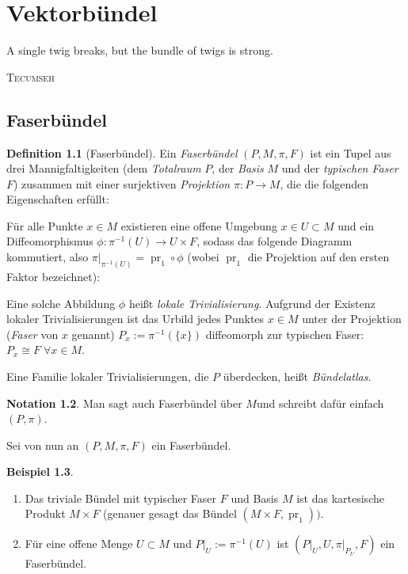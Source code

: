 \documentclass[a4paper]{scrbook}
\numberwithin{equation}{chapter}
\DeclareMathOperator{\pr}{pr}
\theoremstyle{definition}
\newtheorem{defn}{Definition}[section]
\newtheorem{bsp}[defn]{Beispiel}
\newtheorem{nota}[defn]{Notation}
\begin{document}
\chapter{Vektorbündel}
\epigraph{A single twig breaks, but the bundle of twigs is strong.}{\textsc{Tecumseh}}
	\section{Faserbündel}
		\begin{defn}[Faserbündel]
			Ein \emph{Faserbündel} $(P,M,\pi ,F)$ ist ein Tupel aus drei Mannigfaltigkeiten (dem \emph{Totalraum} $P$, der \emph{Basis} $M$ und der \emph{typischen Faser} $F$) zusammen mit einer surjektiven \emph{Projektion} $\pi\colon P\rightarrow M$, die die folgenden Eigenschaften erfüllt:

				Für alle Punkte $x\in M$ existieren eine offene Umgebung $x\in U\subset M$ und ein Diffeomorphismus $\phi\colon \pi^{-1}(U)\rightarrow U\times F$, sodass das folgende Diagramm kommutiert, also $\pi\vert_{\pi^{-1}(U)}=\pr_1\circ\phi$ (wobei $\pr_1$ die Projektion auf den ersten Faktor bezeichnet):
			\begin{center}
			\end{center}
			Eine solche Abbildung $\phi$ heißt \emph{lokale Trivialisierung}. Aufgrund der Existenz lokaler Trivialisierungen ist das Urbild jedes Punktes $x\in M$ unter der Projektion (\emph{Faser} von $x$ genannt) $P_x:=\pi^{-1}(\lbrace x\rbrace )$ diffeomorph zur typischen Faser: $P_x\cong F \; \forall x\in M$.

			Eine Familie lokaler Trivialisierungen, die $P$ überdecken, heißt \emph{Bündelatlas}.
		\end{defn}
		\begin{nota}
			Man sagt auch \glqq Faserbündel über $M$\grqq und schreibt dafür einfach $(P,\pi)$.
		\end{nota}
		Sei von nun an $(P,M,\pi ,F)$ ein Faserbündel.
		\begin{bsp}\hfill
			\begin{enumerate}[label=(\alph*)]
				\item Das triviale Bündel mit typischer Faser $F$ und Basis $M$ ist das kartesische Produkt $M\times F$ (genauer gesagt das Bündel $(M\times F,\pr_1))$.
				\item Für eine offene Menge $U\subset M$ und $P\vert_U:=\pi^{-1}(U)$ ist $(P\vert_U,U,\pi\vert_{P_U},F)$ ein Faserbündel.
			\end{enumerate}
		\end{bsp}
\end{document}
